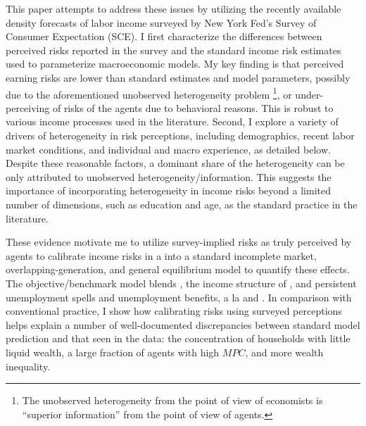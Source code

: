 
This paper attempts to address these issues by utilizing the recently available density forecasts of labor income surveyed by New York Fed's Survey of Consumer Expectation (SCE). I first characterize the differences between perceived risks reported in the survey and the standard income risk estimates used to parameterize macroeconomic models. My key finding is that perceived earning risks are lower than standard estimates and model parameters, possibly due to the aforementioned unobserved heterogeneity problem \footnote{The unobserved heterogeneity from the point of view of economists is ``superior information'' from the point of view of agents.}, or under-perceiving of risks of the agents due to behavioral reasons. This is robust to various income processes used in the literature.
Second, I explore a variety of drivers of heterogeneity in risk perceptions, including demographics, recent labor market conditions, and individual and macro experience, as detailed below. Despite these reasonable factors, a dominant share of the heterogeneity can be only attributed to unobserved heterogeneity/information. This suggests the importance of incorporating heterogeneity in income risks beyond a limited number of dimensions, such as education and age, as the standard practice in the literature. 

These evidence motivate me to utilize survey-implied risks as truly perceived by agents to calibrate income risks in a into a standard incomplete market, overlapping-generation, and general equilibrium model to quantify these effects. The objective/benchmark model blends \cite{huggett1996wealth}, the income structure of \cite{carroll1997nature}, and persistent unemployment spells and unemployment benefits, a la \cite{krueger2016macroeconomics} and \cite{carroll2017distribution}. In comparison with conventional practice, I show how calibrating risks using surveyed perceptions helps explain a number of well-documented discrepancies between standard model prediction and that seen in the data: the concentration of households with little liquid wealth, a large fraction of agents with high $MPC$, and more wealth inequality. 


